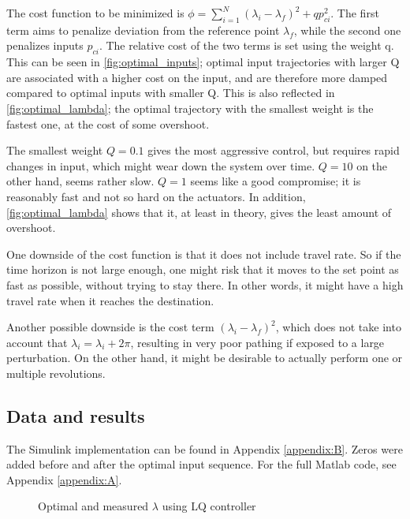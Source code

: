 The cost function to be minimized is $\phi = \sum_{i=1}^{N} (\lambda_i-\lambda_f)^2 + qp_{ci}^2$. The first term aims to penalize deviation from the reference point $\lambda_f$, while the second one penalizes inputs $p_{ci}$. The relative cost of the two terms is set using the weight q. This can be seen in \cref{fig:optimal_inputs}; optimal input trajectories with larger Q are associated with a higher cost on the input, and are therefore more damped compared to optimal inputs with smaller Q. This is also reflected in \cref{fig:optimal_lambda}; the optimal trajectory with the smallest weight is the fastest one, at the cost of some overshoot.

The smallest weight $Q=0.1$ gives the most aggressive control, but requires rapid changes in input, which might wear down the system over time. $Q=10$ on the other hand, seems rather slow. $Q=1$ seems like a good compromise; it is reasonably fast and not so hard on the actuators. In addition, \cref{fig:optimal_lambda} shows that it, at least in theory, gives the least amount of overshoot.

One downside of the cost function is that it does not include travel rate. So if the time horizon is not large enough, one might risk that it moves to the set point as fast as possible, without trying to stay there. In other words, it might have a high travel rate when it reaches the destination.

Another possible downside is the cost term $(\lambda_i - \lambda_f)^2$, which does not take into account that $\lambda_i = \lambda_ i + 2\pi$, resulting in very poor pathing if exposed to a large perturbation. On the other hand, it might be desirable to actually perform one or multiple revolutions.
\clearpage

\subsection{Data and results}
The Simulink implementation can be found in Appendix \ref{appendix:B}. Zeros were added before and after the optimal input sequence. For the full Matlab code, see Appendix \ref{appendix:A}.

\begin{figure}[H]
    \centering
    \caption{Optimal and measured $\lambda$ using LQ controller}
    \label{fig:my_label}
\end{figure}

